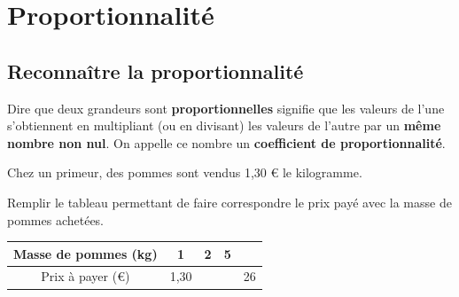 \documentclass[a4paper]{book}
\begin{document}
\setcounter{chapter}{8}
\renewcommand{\monTitre}{Proportionnalité}
\chapter{\monTitre}
\thispagestyle{fancy}


\section{Reconnaître la proportionnalité}

    \begin{definition}
        Dire que deux grandeurs sont \textbf{proportionnelles} signifie que les valeurs de l'une s'obtiennent en multipliant (ou en divisant) les valeurs de l'autre par un \textbf{même nombre non nul}. On appelle ce nombre un \textbf{coefficient de proportionnalité}.

    \end{definition}


    \begin{exemple}
        Chez un primeur, des pommes sont vendus 1,30 € le kilogramme.

        Remplir le tableau permettant de faire correspondre le prix payé avec la masse de pommes achetées.

        \begin{center}
            \renewcommand{\arraystretch}{1.5}
            \begin{tabular}{|c|c|c|c|c|}
                \hline
                Masse de pommes (kg) & 1    & 2 & 5 &  \\ \hline
                Prix à payer (€)     & 1,30 &   &   & 26 \\ \hline
            \end{tabular}
        \end{center}
    \end{exemple}
\end{document}
